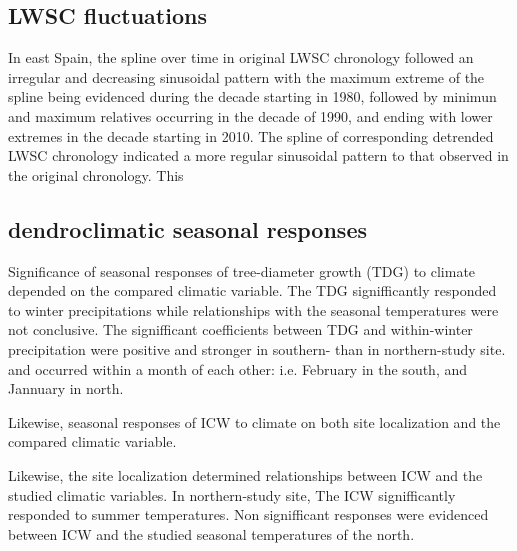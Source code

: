 \documentclass[review,authoryear]{elsarticle}
\begin{document}
\subsection{\acrlong{LWSC} fluctuations}

In east Spain, the spline over time in original \gls{LWSC} chronology
followed an irregular and decreasing sinusoidal pattern with the
maximum extreme of the spline being evidenced during the decade
starting in 1980, followed by minimun and maximum relatives occurring
in the decade of 1990, and ending with lower extremes in the decade
starting in 2010.  The spline of corresponding detrended \gls{LWSC}
chronology indicated a more regular sinusoidal pattern to that
observed in the original chronology. This

\subsection{dendroclimatic seasonal responses}

Significance of seasonal responses of tree-diameter growth (TDG) to
climate depended on the compared climatic variable. The TDG
signifficantly responded to winter precipitations while relationships
with the seasonal temperatures were not conclusive. The signifficant
coefficients between TDG and within-winter precipitation were positive
and stronger in southern- than in northern-study site. and occurred
within a month of each other: i.e. February in the south, and Jannuary
in north.

Likewise, seasonal responses of ICW to climate on both site
localization and the compared climatic variable.

Likewise, the site localization determined relationships between ICW
and the studied climatic variables. In northern-study site, The ICW
signifficantly responded to summer temperatures. Non signifficant
responses were evidenced between ICW and the studied seasonal
temperatures of the north.






\newpage
\end{document}
